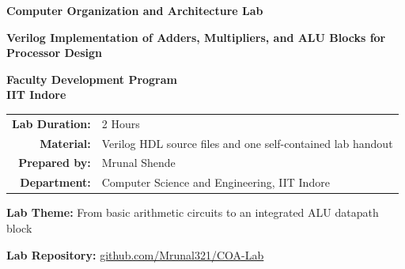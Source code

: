 \documentclass[11pt,a4paper]{article}
\begin{document}

\begin{titlepage}
\centering
\vspace*{1.0cm}

{\Huge \bfseries \color{IITBlue} Computer Organization and Architecture Lab\par}
\vspace{0.6cm}

{\Large \bfseries Verilog Implementation of Adders, Multipliers, and ALU Blocks for Processor Design\par}

\vspace{1.2cm}

\begin{tcolorbox}[
    colback=IITLightBlue,
    colframe=IITBlue,
    width=0.88\textwidth,
    arc=2mm,
    boxrule=1pt
]
\centering
\Large
\textbf{Faculty Development Program}\\[0.2cm]
\textbf{IIT Indore}
\end{tcolorbox}

\vspace{1.4cm}

\begin{tabular}{rl}
\textbf{Lab Duration:} & 2 Hours \\
\textbf{Material:} & Verilog HDL source files and one self-contained lab handout \\
\textbf{Prepared by:} & Mrunal Shende \\
\textbf{Department:} & Computer Science and Engineering, IIT Indore \\
\end{tabular}

\vfill

{\large \textbf{Lab Theme:} From basic arithmetic circuits to an integrated ALU datapath block}

\vspace{0.6cm}

{\large \textbf{Lab Repository:} \href{https://github.com/Mrunal321/COA-Lab}{github.com/Mrunal321/COA-Lab}}

\vspace{1cm}
\end{titlepage}

\tableofcontents
\newpage

\end{document}
